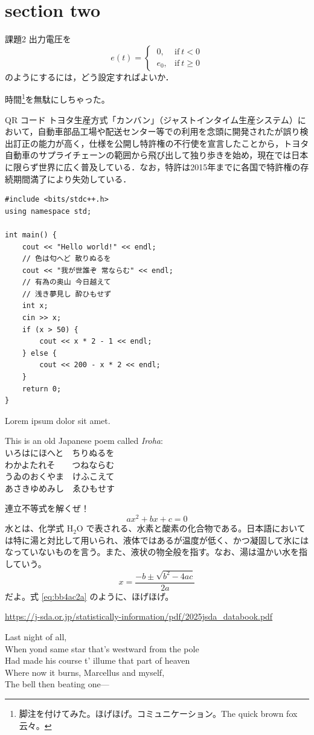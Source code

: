 \section{section two}

\begin{mytbox}{課題2}
	出力電圧を
	\begin{equation*}
		e(t) =
		\begin{cases}
			\ 0,   & \text{if}\ t < 0   \\
			\ e_0, & \text{if}\ t \ge 0
		\end{cases}
	\end{equation*}
	のようにするには，どう設定すればよいか．
\end{mytbox}

時間\footnote{脚注を付けてみた。ほげほげ。コミュニケーション。The quick brown fox 云々。}を無駄にしちゃった。

\begin{mybbox}{QR コード}
	トヨタ生産方式「カンバン」（ジャストインタイム生産システム）において，自動車部品工場や配送センター等での利用を念頭に開発されたが誤り検出訂正の能力が高く，仕様を公開し特許権の不行使を宣言したことから，トヨタ自動車のサプライチェーンの範囲から飛び出して独り歩きを始め，現在では日本に限らず世界に広く普及している．なお，特許は2015年までに各国で特許権の存続期間満了により失効している．
\end{mybbox}

\begin{verbatim}
#include <bits/stdc++.h>
using namespace std;

int main() {
    cout << "Hello world!" << endl;
    // 色は匂へど 散りぬるを
    cout << "我が世誰ぞ 常ならむ" << endl;
    // 有為の奥山 今日越えて
    // 浅き夢見し 酔ひもせず
    int x;
    cin >> x;
    if (x > 50) {
        cout << x * 2 - 1 << endl;
    } else {
        cout << 200 - x * 2 << endl;
    }
    return 0;
}
\end{verbatim}

Lorem ipsum dolor sit amet.

This is an old Japanese poem called \emph{Iroha}: \\
いろはにほへと　ちりぬるを \\
わかよたれそ　　つねならむ \\
うゐのおくやま　けふこえて \\
あさきゆめみし　ゑひもせす

連立不等式を解くぜ！
\begin{equation}
	ax^2 + bx + c = 0
\end{equation}
水とは、化学式 \(\textrm{H}_2\textrm{O}\) で表される、水素と酸素の化合物である。日本語においては特に湯と対比して用いられ、液体ではあるが温度が低く、かつ凝固して氷にはなっていないものを言う。また、液状の物全般を指す。なお、湯は温かい水を指していう。
\begin{equation}
	x = \frac{-b \pm \sqrt{b^2 - 4ac}}{2a}
    \label{eq:bb4ac2a}
\end{equation}
だよ。式 \ref{eq:bb4ac2a} のように、ほげほげ。

\url{https://j-sda.or.jp/statistically-information/pdf/2025jsda_databook.pdf}

Last night of all, \\
When yond same star that's westward from the pole \\
Had made his course t' illume that part of heaven \\
Where now it burns, Marcellus and myself, \\
The bell then beating one—
